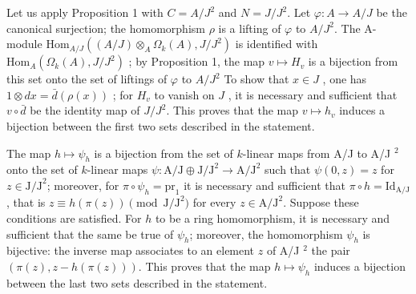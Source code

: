 Let us apply Proposition 1 with \(C = A / J^2\) and \(N = J / J^2\). Let \(\varphi : A \to A / J\) be the canonical surjection; the homomorphism \(\rho\) is a lifting of \(\varphi\) to \(A / J^2\). The A-module \(\text{Hom}_{A / J}((A / J) \otimes_A \Omega_k(A), J / J^2)\) is identified with \(\text{Hom}_A(\Omega_k(A), J / J^2)\) ; by Proposition 1, the map \(v \mapsto H_v\) is a bijection from this set onto the set of liftings of \(\varphi\) to \(A / J^2\) To show that \(x \in J\) , one has \(1 \otimes dx = \bar{d}(\rho(x))\) ; for \(H_v\) to vanish on \(J\) , it is necessary and sufficient that \(v \circ \bar{d}\) be the identity map of \(J / J^2\). This proves that the map \(v \mapsto h_v\) induces a bijection between the first two sets described in the statement.

The map \(h \mapsto \psi_h\) is a bijection from the set of \(k\)-linear maps from A/J to A/J \(^2\) onto the set of \(k\)-linear maps \(\psi : \text{A/J} \oplus \text{J/J}^2 \longrightarrow \text{A/J}^2\) such that \(\psi(0,z) = z\) for \(z \in \text{J/J}^2\); moreover, for \(\pi \circ \psi_h = \text{pr}_1\) it is necessary and sufficient that \(\pi \circ h = \text{Id}_{\text{A/J}}\), that is \(z \equiv h(\pi(z)) \pmod{\text{J/J}^2}\) for every \(z \in \text{A/J}^2\). Suppose these conditions are satisfied. For \(h\) to be a ring homomorphism, it is necessary and sufficient that the same be true of \(\psi_h\); moreover, the homomorphism \(\psi_h\) is bijective: the inverse map associates to an element \(z\) of A/J \(^2\) the pair \((\pi(z), z - h(\pi(z)))\). This proves that the map \(h \mapsto \psi_h\) induces a bijection between the last two sets described in the statement.

